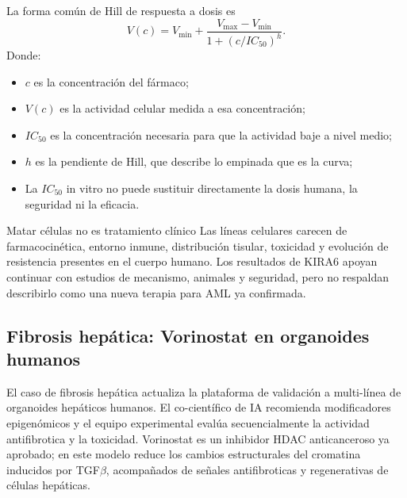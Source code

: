 La forma común de Hill de respuesta a dosis es
$$
V(c)=V_{\min}+\frac{V_{\max}-V_{\min}}
{1+(c/IC_{50})^{h}}.
$$
Donde:
\begin{itemize}
  \item $c$ es la concentración del fármaco;
  \item $V(c)$ es la actividad celular medida a esa concentración;
  \item $IC_{50}$ es la concentración necesaria para que la actividad baje a nivel medio;
  \item $h$ es la pendiente de Hill, que describe lo empinada que es la curva;
  \item La $IC_{50}$ in vitro no puede sustituir directamente la dosis humana, la seguridad ni la eficacia.
\end{itemize}


\begin{warningbox}{Matar células no es tratamiento clínico}
Las líneas celulares carecen de farmacocinética, entorno inmune, distribución tisular, toxicidad y evolución de resistencia presentes en el cuerpo humano. Los resultados de KIRA6 apoyan continuar con estudios de mecanismo, animales y seguridad, pero no respaldan describirlo como una nueva terapia para AML ya confirmada.
\end{warningbox}

\subsection{Fibrosis hepática: Vorinostat en organoides humanos}

El caso de fibrosis hepática actualiza la plataforma de validación a multi-línea de organoides hepáticos humanos. El co-científico de IA recomienda modificadores epigenómicos y el equipo experimental evalúa secuencialmente la actividad antifibrotica y la toxicidad. Vorinostat es un inhibidor HDAC anticanceroso ya aprobado; en este modelo reduce los cambios estructurales del cromatina inducidos por TGF$\beta$, acompañados de señales antifibroticas y regenerativas de células hepáticas.


